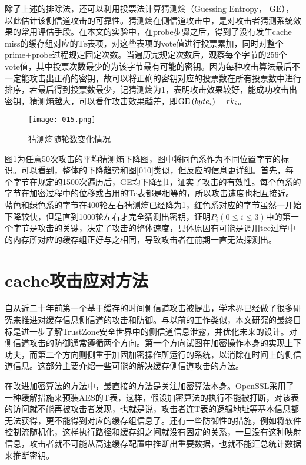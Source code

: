 除了上述的排除法，还可以利用投票法计算猜测熵（Guessing Entropy， GE），以此估计该侧信道攻击的可靠性。猜测熵在侧信道攻击中，是对攻击者猜测系统效果的常用评估手段。在本文的实验中，在probe步骤之后，得到了没有发生cache miss的缓存组对应的Te表项，对这些表项的vote值进行投票累加，同时对整个prime+probe过程规定固定次数。当遍历完规定次数后，观察每个字节的256个vote值，其中投票次数最少的为该字节最有可能的密钥。因为每种攻击算法最后不一定能攻击出正确的密钥，故可以将正确的密钥对应的投票数在所有投票数中进行排序，若最后得到投票数最少，记猜测熵为1，表明攻击效果较好，能成功攻击出密钥，猜测熵越大，可以看作攻击效果越差，即${\rm{GE}}\left( {byt{e_i}} \right) = r{k_i}$。


\begin{figure}[H]
	\centering
	\texttt{[image: 015.png]}
	\caption{猜测熵随轮数变化情况}
	\label{015}
\end{figure}


图\ref{015}为任意50次攻击的平均猜测熵下降图，图中将同色系作为不同位置字节的标识。可以看到，整体的下降趋势和图\ref{010}类似，但反应的信息更详细。首先，每个字节在规定的1500次遍历后，GE均下降到1，证实了攻击的有效性。每个色系的字节在加密过程中的位移或占用的Te表都是相等的，所以攻击速度也相互接近。蓝色和绿色系的字节在400轮左右猜测熵已经降为1，红色系对应的字节虽然一开始下降较快，但是直到1000轮左右才完全猜测出密钥，证明${P_i}\left( {0 \le i \le 3} \right)$中的第一个字节是攻击的关键，决定了攻击的整体速度，具体原因有可能是调用tee过程中的内存所对应的缓存组正好与之相同，导致攻击者在前期一直无法探测出。


\section{cache攻击应对方法}

自从近二十年前第一个基于缓存的时间侧信道攻击被提出，学术界已经做了很多研究来推进对缓存信息侧信道的攻击和防御。与以前的工作类似，本文研究的最终目标是进一步了解TrustZone安全世界中的侧信道信息泄露，并优化未来的设计。对侧信道攻击的防御通常遵循两个方向。第一个方向试图在加密操作本身的实现上下功夫，而第二个方向则侧重于加固加密操作所运行的系统，以消除在时间上的侧信道信息。这部分主要介绍一些可能的解决缓存侧信道攻击的方法。

在改进加密算法的方法中，最直接的方法是关注加密算法本身。OpenSSL采用了一种缓解措施来预装AES的T表，这样，假设加密算法的执行不能被打断，对该表的访问就不能再被攻击者发现，也就是说，攻击者连T表的逻辑地址等基本信息都无法获得，更不能得到对应的缓存组信息了。还有一些防御性的措施，例如将软件控制流随机化\cite{crane2015thwarting}，这样执行路径和缓存组之间就没有固定的关系，一旦没有这种映射信息，攻击者就不可能从高速缓存配置中推断出重要数据，也就不能汇总统计数据来推断密钥。

